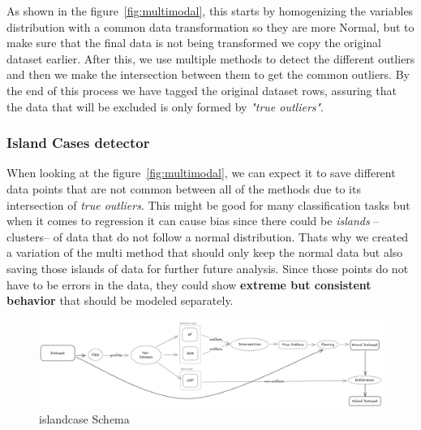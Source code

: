 \documentclass[11pt,english,a4paper,hidelinks]{book}
\begin{document}
\vspace{0.5cm}
\noindent As shown in the figure~\ref{fig:multimodal}, this starts by homogenizing the variables distribution with a common data transformation so they are more Normal, but to make sure that the final data is not being transformed we copy the original dataset earlier. After this, we use multiple methods to detect the different outliers and then we make the intersection between them to get the common outliers. By the end of this process we have tagged the original dataset rows, assuring that the data that will be excluded is only formed by \textit{"true outliers"}.


\subsubsection{Island Cases detector}


When looking at the figure~\ref{fig:multimodal}, we can expect it to save different data points that are not common between all of the methods due to its intersection of \textit{true outliers}. This might be good for many classification tasks but when it comes to regression it can cause bias since there could be \textit{islands} --clusters-- of data that do not follow a normal distribution. Thats why we created a variation of the \acrshort{multi} method that should only keep the normal data but also saving those islands of data for further future analysis. Since those points do not have to be errors in the data,  they could show \textbf{extreme but consistent behavior} that should be modeled separately.

\begin{figure}[H]
    \centering
    \includegraphics[width=1\textwidth]{images/code/outliers/Islands.png}
    \caption{\acrshort{islandcase} Schema}
    \label{fig:islands_of_outliers}
\end{figure}
\end{document}
